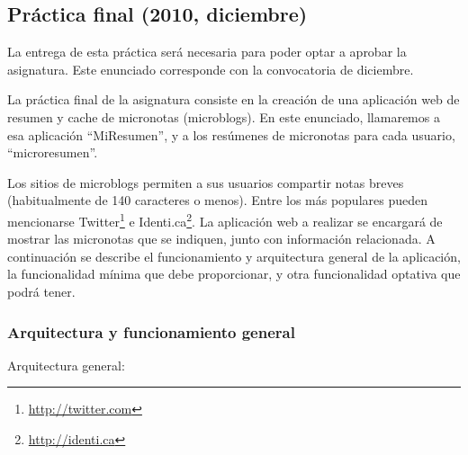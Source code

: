 \subsection{Práctica final (2010, diciembre)}

La entrega de esta práctica será necesaria para poder optar a aprobar la asignatura.
 Este enunciado corresponde con la convocatoria de diciembre.

La práctica final de la asignatura consiste en la creación de una aplicación web de resumen y cache de micronotas (microblogs). En este enunciado, llamaremos a esa aplicación ``MiResumen'', y a los resúmenes de micronotas para cada usuario, ``microresumen''.

Los sitios de microblogs permiten a sus usuarios compartir notas breves (habitualmente de 140 caracteres o menos). Entre los más populares pueden mencionarse Twitter\footnote{\url{http://twitter.com}} e Identi.ca\footnote{\url{http://identi.ca}}. La aplicación web a realizar se encargará de mostrar las micronotas que se indiquen, junto con información relacionada. A continuación se describe el funcionamiento y arquitectura general de la aplicación, la funcionalidad mínima que debe proporcionar, y otra funcionalidad optativa que podrá tener.

\subsubsection{Arquitectura y funcionamiento general}

Arquitectura general:

